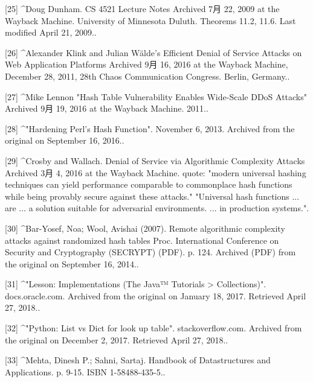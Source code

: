 [25]
^Doug Dunham. CS 4521 Lecture Notes Archived 7月 22, 2009 at the Wayback Machine. University of Minnesota Duluth. Theorems 11.2, 11.6. Last modified April 21, 2009..

[26]
^Alexander Klink and Julian Wälde's Efficient Denial of Service Attacks on Web Application Platforms Archived 9月 16, 2016 at the Wayback Machine, December 28, 2011, 28th Chaos Communication Congress. Berlin, Germany..

[27]
^Mike Lennon "Hash Table Vulnerability Enables Wide-Scale DDoS Attacks" Archived 9月 19, 2016 at the Wayback Machine. 2011..

[28]
^"Hardening Perl's Hash Function". November 6, 2013. Archived from the original on September 16, 2016..

[29]
^Crosby and Wallach. Denial of Service via Algorithmic Complexity Attacks Archived 3月 4, 2016 at the Wayback Machine. quote: "modern universal hashing techniques can yield performance comparable to commonplace hash functions while being provably secure against these attacks." "Universal hash functions ... are ... a solution suitable for adversarial environments. ... in production systems.".

[30]
^Bar-Yosef, Noa; Wool, Avishai (2007). Remote algorithmic complexity attacks against randomized hash tables Proc. International Conference on Security and Cryptography (SECRYPT) (PDF). p. 124. Archived (PDF) from the original on September 16, 2014..

[31]
^"Lesson: Implementations (The Java™ Tutorials > Collections)". docs.oracle.com. Archived from the original on January 18, 2017. Retrieved April 27, 2018..

[32]
^"Python: List vs Dict for look up table". stackoverflow.com. Archived from the original on December 2, 2017. Retrieved April 27, 2018..

[33]
^Mehta, Dinesh P.; Sahni, Sartaj. Handbook of Datastructures and Applications. p. 9-15. ISBN 1-58488-435-5..